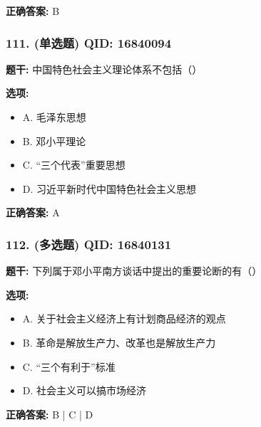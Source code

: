 \documentclass[12pt,UTF8]{ctexart}
\begin{document}
\textbf{正确答案:}
B

\vspace{0.3em}\hrulefill\vspace{0.7em}

\subsubsection*{111. (单选题) \small QID: 16840094}

\textbf{题干:}
中国特色社会主义理论体系不包括（）

\textbf{选项:}
\begin{itemize}[leftmargin=*]

  \item A. 毛泽东思想

  \item B. 邓小平理论

  \item C. “三个代表”重要思想

  \item D. 习近平新时代中国特色社会主义思想

\end{itemize}

\textbf{正确答案:}
A

\vspace{0.3em}\hrulefill\vspace{0.7em}

\subsubsection*{112. (多选题) \small QID: 16840131}

\textbf{题干:}
下列属于邓小平南方谈话中提出的重要论断的有（）

\textbf{选项:}
\begin{itemize}[leftmargin=*]

  \item A. 关于社会主义经济上有计划商品经济的观点

  \item B. 革命是解放生产力、改革也是解放生产力

  \item C. “三个有利于”标准

  \item D. 社会主义可以搞市场经济

\end{itemize}

\textbf{正确答案:}
B | C | D

\vspace{0.3em}\hrulefill\vspace{0.7em}
\end{document}

